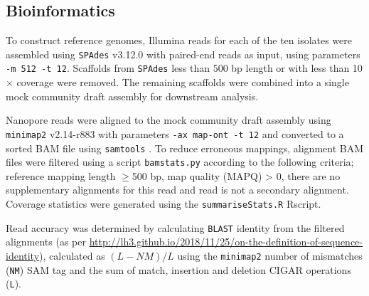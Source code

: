 \documentclass[a4paper,num-refs]{oup-contemporary}
\begin{document}
\subsection{Bioinformatics}
To construct reference genomes, Illumina reads for each of the ten isolates were assembled using \texttt{SPAdes} v3.12.0 \cite{Bankevich2012-iu} with paired-end reads as input, using parameters \texttt{-m 512 -t 12}.
Scaffolds from \texttt{SPAdes} less than 500 bp length or with less than 10$\times$ coverage were removed. The remaining scaffolds were combined into a single mock community draft assembly for downstream analysis.

Nanopore reads were aligned to the mock community draft assembly using \texttt{minimap2} \cite{li2018minimap2} v2.14-r883 with parameters \texttt{-ax map-ont -t 12} and converted to a sorted BAM file using \texttt{samtools} \cite{li2009sequence}.
To reduce erroneous mappings, alignment BAM files were filtered using a script \texttt{bamstats.py} according to the following criteria; reference mapping length $\geq$500 bp, map quality (MAPQ) > 0, there are no supplementary alignments for this read and read is not a secondary alignment.
Coverage statistics were generated using the \texttt{summariseStats.R} Rscript. 


Read accuracy was determined by calculating \texttt{BLAST} identity from the filtered alignments (as per \url{http://lh3.github.io/2018/11/25/on-the-definition-of-sequence-identity}), calculated as $(L-NM)/L$ using the \texttt{minimap2} number of mismatches (\texttt{NM}) SAM tag and the sum of match, insertion and deletion CIGAR operations (\texttt{L}). 
\vfill\null
\end{document}

